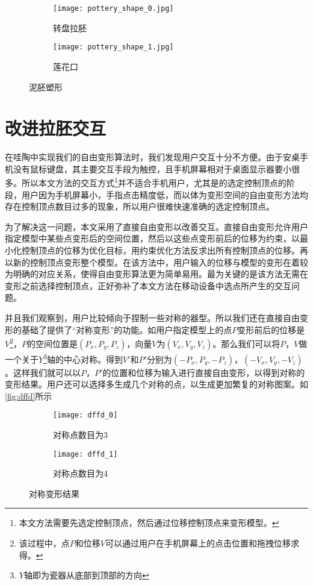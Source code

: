\begin{figure}[htbp]
	\centering
	\begin{subfigure}[b]{.4\textwidth}
		\centering
		\texttt{[image: pottery\_shape\_0.jpg]}
		\caption{转盘拉胚}\label{subfig:pottery_shape_0}
	\end{subfigure}
	\begin{subfigure}[b]{.4\textwidth}
		\centering
		\texttt{[image: pottery\_shape\_1.jpg]}
		\caption{莲花口}\label{subfig:pottery_shape_1}
	\end{subfigure}
	\caption{泥胚塑形}\label{fig:pottery_shape}
\end{figure}

\section{改进拉胚交互}
在哇陶中实现我们的自由变形算法时，我们发现用户交互十分不方便。由于安桌手机没有鼠标键盘，其主要交互手段为触控，且手机屏幕相对于桌面显示器要小很多。所以本文方法的交互方式\footnote{本文方法需要先选定控制顶点，然后通过位移控制顶点来变形模型。}并不适合手机用户，尤其是的选定控制顶点的阶段，用户因为手机屏幕小，手指点击精度低，而以体为变形空间的自由变形方法均存在控制顶点数目过多的现象，所以用户很难快速准确的选定控制顶点。

为了解决这一问题，本文采用了直接自由变形\cite{hsu1992}以改善交互。直接自由变形允许用户指定模型中某些点变形后的空间位置，然后以这些点变形前后的位移为约束，以最小化控制顶点的位移为优化目标，用约束优化方法反求出所有控制顶点的位移。再以新的控制顶点变形整个模型。在该方法中，用户输入的位移与模型的变形在着较为明确的对应关系，使得自由变形算法更为简单易用。最为关键的是该方法无需在变形之前选择控制顶点，正好弥补了本文方法在移动设备中选点所产生的交互问题。

并且我们观察到，用户比较倾向于捏制一些对称的器型。所以我们还在直接自由变形的基础了提供了“对称变形”的功能。如用户指定模型上的点$P$变形前后的位移是$V$\footnote{该过程中，点$P$和位移$V$可以通过用户在手机屏幕上的点击位置和拖拽位移求得。}，$P$的空间位置是$(P_x, P_y, P_z)$，向量$V$为$(V_x, V_y, V_z)$。那么我们可以将$P$，$V$做一个关于$Y$\footnote{$Y$轴即为瓷器从底部到顶部的方向}轴的中心对称。得到$V'$和$P'$分别为$(-P_x, P_y, -P_z)$，$(-V_x, V_y, -V_z)$。这样我们就可以以$P$，$P'$的位置和位移为输入进行直接自由变形，以得到对称的变形结果。用户还可以选择多生成几个对称的点，以生成更加繁复的对称图案。如\autoref{fig:dffd}所示

\begin{figure}[htbp]
	\centering
	\begin{subfigure}[b]{.4\textwidth}
		\centering
		\texttt{[image: dffd\_0]}
		\caption{对称点数目为3}\label{subfig:dffd_0}
	\end{subfigure}
	\begin{subfigure}[b]{.4\textwidth}
		\centering
		\texttt{[image: dffd\_1]}
		\caption{对称点数目为4}\label{subfig:dffd_1}
	\end{subfigure}
	\caption{对称变形结果}\label{fig:dffd}
\end{figure}
